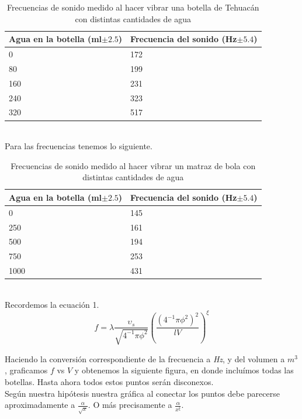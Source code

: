 \documentclass[article,12pt]{elsarticle}
\begin{document}
    \begin{table}[h]
        \centering
        \caption{Frecuencias de sonido medido al hacer vibrar una botella de Tehuacán con distintas cantidades de agua}
        \label{tab:tehua}
            \begin{tabular}{@{}ll@{}}
                \toprule
                Agua en la botella (ml$\pm 2.5$) & Frecuencia del sonido (Hz$\pm5.4$) \\ \midrule
                0 & 172 \\
                80 & 199 \\
                160 & 231 \\
                240 & 323 \\
                320 & 517 \\ \bottomrule
            \end{tabular}%
        \end{table}\\
Para las frecuencias tenemos lo siguiente.
        \begin{table}[h]
        \centering
        \caption{Frecuencias de sonido medido al hacer vibrar un matraz de bola con distintas cantidades de agua}
        \label{tab:matraz}
            \begin{tabular}{@{}ll@{}}
                \toprule
                Agua en la botella (ml$\pm 2.5$) & Frecuencia del sonido (Hz$\pm5.4$) \\ \midrule
                0 & 145 \\
                250 & 161 \\
                500 & 194 \\
                750 & 253 \\
                1000 & 431 \\ \bottomrule
            \end{tabular}%
        \end{table}\\

        Recordemos la ecuación 1.
        \begin{equation*}
         f = \lambda \frac{\upsilon_s}{\sqrt{4^{-1}\pi \phi^2}} \left( \frac{(4^{-1}\pi \phi^2)^2}{lV} \right)^{\xi}
         \end{equation*}

\newpage
        Haciendo la conversión correspondiente de la frecuencia a \textit{Hz}, y del volumen a $m^3$, graficamos $f$ vs $V$ y obtenemos la siguiente figura, en donde incluímos todas las botellas. Hasta ahora todos estos puntos serán disconexos.\\
        Según nuestra hipótesis nuestra gráfica al conectar los puntos debe parecerse aproximadamente a $\frac{\alpha}{\sqrt{x}}$. O más precisamente a $\frac{\alpha}{x^{\xi}}$.
    
\end{document}
